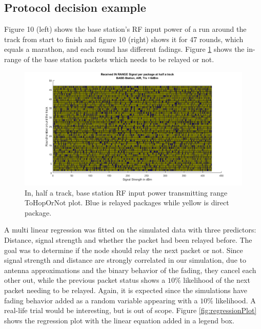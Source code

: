 \subsection{Protocol decision example}\label{sc:protocolDecisionExample}
Figure 10 (left) shows the base station's RF input power of a run around the track from start to finish and figure 10 (right) shows it for 47 rounds, which equals a marathon, and each round has different fadings. Figure \ref{fig:recievedSignal_inRange_halfTrack} shows the in-range of the base station packets which needs to be relayed or not.


\begin{figure}[h]
	\centering
	\includegraphics[width=\linewidth]{theory/protocolDecisionExample/fig/recievedSignal_inRange_halfTrack.png}
	\caption{In, half a track, base station RF input power transmitting range ToHopOrNot plot. Blue is relayed packages while yellow is direct package.}
	\label{fig:recievedSignal_inRange_halfTrack}
\end{figure}

\noindent A multi linear regression was fitted on the simulated data with three predictors: Distance, signal strength and whether the packet had been relayed before. The goal was to determine if the node should relay the next packet or not. Since signal strength and distance are strongly correlated in our simulation, due to antenna approximations and the binary behavior of the fading, they cancel each other out, while the previous packet status shows a $10\%$ likelihood of the next packet needing to be relayed. Again, it is expected since the simulations have fading behavior added as a random variable appearing with a $10\%$ likelihood. A real-life trial would be interesting, but is out of scope. Figure \ref{fig:regressionPlot} shows the regression plot with the linear equation added in a legend box.

